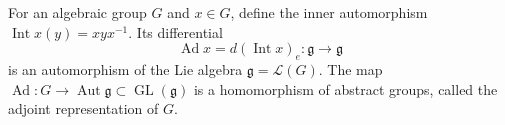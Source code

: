 For an algebraic group $G$ and $x \in G$, define the inner automorphism $\operatorname{Int} x (y) = xyx^{-1}$. Its differential
$$\operatorname{Ad} x = d(\operatorname{Int} x)_e: \mathfrak{g} \to \mathfrak{g}$$
is an automorphism of the Lie algebra $\mathfrak{g} = \mathcal{L}(G)$. The map $\operatorname{Ad}: G \to \operatorname{Aut} \mathfrak{g} \subset \operatorname{GL}(\mathfrak{g})$ is a homomorphism of abstract groups, called the adjoint representation of $G$.
